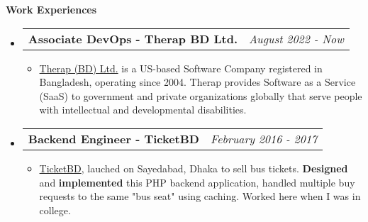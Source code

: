 \documentclass[legalpaper,10pt]{article}
\makeatletter
\newcommand{\resheading}[1]{{\large \colorbox{mygrey}{\begin{minipage}{\textwidth}{\textbf{#1 \vphantom{p\^{E}}}}\end{minipage}}}}
\newcommand{\ressubheading}[4]{
	\begin{tabular*}{7.1in}{l@{\extracolsep{\fill}}r}
		\textbf{#1} & \textit{#4} \\
	\end{tabular*}\vspace{-6pt}}
\makeatother
\begin{document}
	\resheading{Work Experiences}
	\begin{itemize}
	
		\item \ressubheading{Associate DevOps - Therap BD Ltd.}{}{}{August 2022 - Now}
		\begin{itemize} 
			\item \href{https://therapbd.com/}{Therap (BD) Ltd.} is a US-based Software Company registered in Bangladesh, operating since 2004. Therap provides Software as a Service (SaaS) to government and private organizations globally that serve people with intellectual and developmental disabilities.
		\end{itemize}	
	
		\item \ressubheading{Backend Engineer - TicketBD}{}{}{February 2016 - 2017}
		\begin{itemize} 
			\item \href{https://www.facebook.com/ticketbd.online}{TicketBD}, lauched on Sayedabad, Dhaka to sell bus tickets. \textbf{Designed} and \textbf{implemented} this PHP backend application, handled multiple buy requests to the same "bus seat" using caching. Worked here when I was in college.
		\end{itemize}
	\end{itemize}

	\vspace{0.20in}
	
\end{document}
